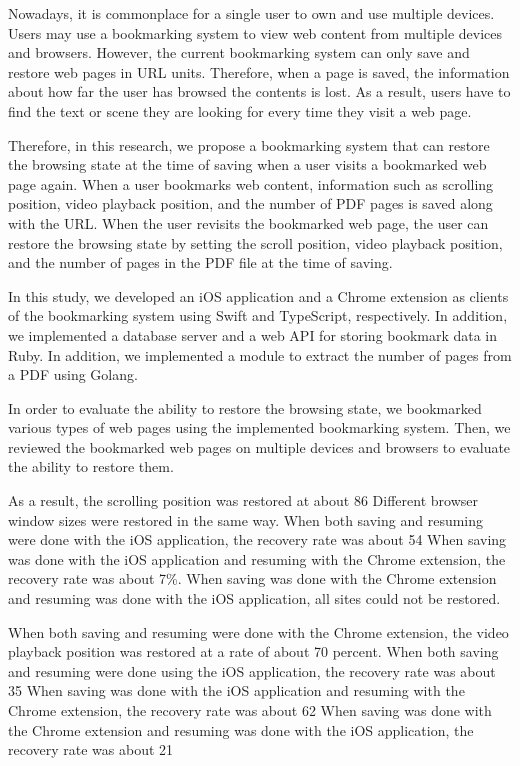 \begin{eabstract}

  Nowadays, it is commonplace for a single user to own and use multiple devices.
  Users may use a bookmarking system to view web content from multiple devices and browsers.
  However, the current bookmarking system can only save and restore web pages in URL units.
  Therefore, when a page is saved, the information about how far the user has browsed the contents is lost.
  As a result, users have to find the text or scene they are looking for every time they visit a web page.  

  Therefore, in this research, we propose a bookmarking system that can restore the browsing state at the time of saving when a user visits a bookmarked web page again.
  When a user bookmarks web content, information such as scrolling position, video playback position, and the number of PDF pages is saved along with the URL.
  When the user revisits the bookmarked web page, the user can restore the browsing state by setting the scroll position, video playback position, and the number of pages in the PDF file at the time of saving.

  In this study, we developed an iOS application and a Chrome extension as clients of the bookmarking system using Swift and TypeScript, respectively.
  In addition, we implemented a database server and a web API for storing bookmark data in Ruby.
  In addition, we implemented a module to extract the number of pages from a PDF using Golang.

  In order to evaluate the ability to restore the browsing state, we bookmarked various types of web pages using the implemented bookmarking system.
  Then, we reviewed the bookmarked web pages on multiple devices and browsers to evaluate the ability to restore them.

  As a result, the scrolling position was restored at about 86%
Different browser window sizes were restored in the same way.
When both saving and resuming were done with the iOS application, the recovery rate was about 54%
When saving was done with the iOS application and resuming with the Chrome extension, the recovery rate was about 7\%.
When saving was done with the Chrome extension and resuming was done with the iOS application, all sites could not be restored.

When both saving and resuming were done with the Chrome extension, the video playback position was restored at a rate of about 70 percent.
When both saving and resuming were done using the iOS application, the recovery rate was about 35%
When saving was done with the iOS application and resuming with the Chrome extension, the recovery rate was about 62%
When saving was done with the Chrome extension and resuming was done with the iOS application, the recovery rate was about 21%


\end{eabstract}
